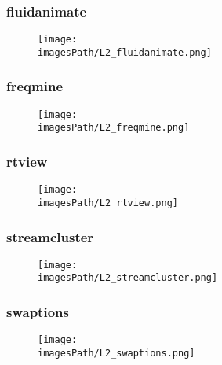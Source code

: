 \documentclass[12pt,a4paper]{article}
\newcommand{\imagesPath}{parsec-3.0/parsec_workspace/graphs}
\begin{document}
			\subsubsection{fluidanimate}
				\begin{figure}[H]
					\begin{center}
						\texttt{[image: \\imagesPath/L2\_fluidanimate.png]}
					\end{center}
				\end{figure}
						
			\subsubsection{freqmine}
				\begin{figure}[H]
					\begin{center}
						\texttt{[image: \\imagesPath/L2\_freqmine.png]}
					\end{center}
				\end{figure}
						
			\subsubsection{rtview}
				\begin{figure}[H]
					\begin{center}
						\texttt{[image: \\imagesPath/L2\_rtview.png]}
					\end{center}
				\end{figure}
						
			\subsubsection{streamcluster}
				\begin{figure}[H]
					\begin{center}
						\texttt{[image: \\imagesPath/L2\_streamcluster.png]}
					\end{center}
			
			\end{figure}
					
			\subsubsection{swaptions}
				\begin{figure}[H]
					\begin{center}
						\texttt{[image: \\imagesPath/L2\_swaptions.png]}
					\end{center}
				\end{figure}
					
\end{document}
